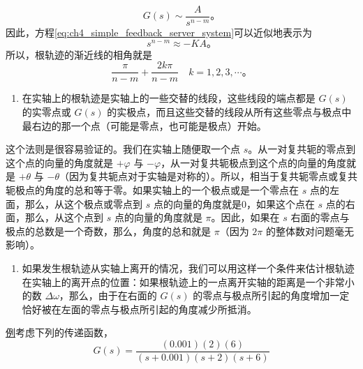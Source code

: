 \begin{equation*}
G(s) \sim \frac{A}{s^{n-m}}。
\end{equation*}
因此，方程\eqref{eq:ch4_simple_feedback_server_system}可以近似地表示为
\begin{equation*}
s^{n-m} \approx -KA。
\end{equation*}
所以，根轨迹的渐近线的相角就是
\begin{equation}\label{eq:ch4_phase_angle_root_locus}
\frac{\pi}{n-m} + \frac{2k\pi}{n-m} \quad k=1,2,3,\cdots。
\end{equation}

\begin{enumerate}[label=法则 \arabic*, start=3]
\item \label{ch4_law_3} 在实轴上的根轨迹是实轴上的一些交替的线段，这些线段的端点都是 $G(s)$ 的实零点或 $G(s)$ 的实极点，而且这些交替的线段从所有这些零点与极点中最右边的那一个点（可能是零点，也可能是极点）开始。
\end{enumerate}

这个法则是很容易验证的。我们在实轴上随便取一个点 $s$。从一对复共轭的零点到这个点的向量的角度就是 $+\varphi$ 与 $-\varphi$，从一对复共轭极点到这个点的向量的角度就是 $+\theta$ 与 $-\theta$（因为复共轭点对于实轴是对称的）。所以，相当于复共轭零点或复共轭极点的角度的总和等于零。如果实轴上的一个极点或是一个零点在 $s$ 点的左面，那么，从这个极点或零点到 $s$ 点的向量的角度就是0，如果这个点在 $s$ 点的右面，那么，从这个点到 $s$ 点的向量的角度就是 $\pi$。因此，如果在 $s$ 右面的零点与极点的总数是一个奇数，那么，角度的总和就是 $\pi$（因为 $2\pi$ 的整体数对问题毫无影响）。

\begin{enumerate}[label=法则 \arabic*, start=4]
\item \label{ch4_law_4} 如果发生根轨迹从实轴上离开的情况，我们可以用这样一个条件来估计根轨迹在实轴上的离开点的位置：如果根轨迹上的一点离开实轴的距离是一个非常小的数 $\Delta\omega$，那么，由于在右面的 $G(s)$ 的零点与极点所引起的角度增加一定恰好被在左面的零点与极点所引起的角度减少所抵消。
\end{enumerate}
\underline{例}\quad 考虑下列的传递函数，
\begin{equation}\label{eq:ch4_transfer_function_example}
G(s) = \frac{(0.001)(2)(6)}{(s+0.001)(s+2)(s+6)}
\end{equation}

